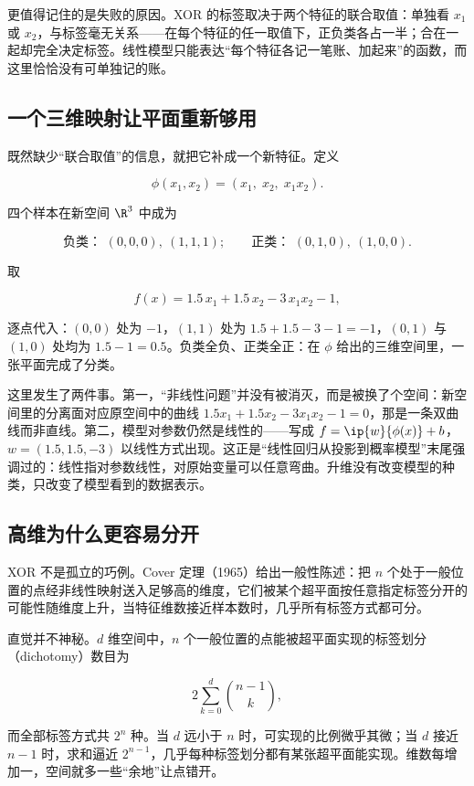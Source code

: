 更值得记住的是失败的原因。XOR 的标签取决于两个特征的联合取值：单独看 \(x_1\) 或 \(x_2\)，与标签毫无关系——在每个特征的任一取值下，正负类各占一半；合在一起却完全决定标签。线性模型只能表达``每个特征各记一笔账、加起来''的函数，而这里恰恰没有可单独记的账。

\subsection{一个三维映射让平面重新够用}

既然缺少``联合取值''的信息，就把它补成一个新特征。定义

\[
\phi(x_1,x_2)=(x_1,\;x_2,\;x_1x_2).
\]

四个样本在新空间 \(\R^3\) 中成为

\[
\text{负类： }(0,0,0),\ (1,1,1);
\qquad
\text{正类： }(0,1,0),\ (1,0,0).
\]

取

\[
f(x)=1.5\,x_1+1.5\,x_2-3\,x_1x_2-1,
\]

逐点代入：\((0,0)\) 处为 \(-1\)，\((1,1)\) 处为 \(1.5+1.5-3-1=-1\)，\((0,1)\) 与 \((1,0)\) 处均为 \(1.5-1=0.5\)。负类全负、正类全正：在 \(\phi\) 给出的三维空间里，一张平面完成了分类。

这里发生了两件事。第一，``非线性问题''并没有被消灭，而是被换了个空间：新空间里的分离面对应原空间中的曲线 \(1.5x_1+1.5x_2-3x_1x_2-1=0\)，那是一条双曲线而非直线。第二，模型对参数仍然是线性的——写成 \(f=\ip{w}{\phi(x)}+b\)，\(w=(1.5,1.5,-3)\) 以线性方式出现。这正是``线性回归从投影到概率模型''末尾强调过的：线性指对参数线性，对原始变量可以任意弯曲。升维没有改变模型的种类，只改变了模型看到的数据表示。

\subsection{高维为什么更容易分开}

XOR 不是孤立的巧例。Cover 定理（1965）给出一般性陈述：把 \(n\) 个处于一般位置的点经非线性映射送入足够高的维度，它们被某个超平面按任意指定标签分开的可能性随维度上升，当特征维数接近样本数时，几乎所有标签方式都可分。

直觉并不神秘。\(d\) 维空间中，\(n\) 个一般位置的点能被超平面实现的标签划分（dichotomy）数目为

\[
2\sum_{k=0}^{d}\binom{n-1}{k},
\]

而全部标签方式共 \(2^n\) 种。当 \(d\) 远小于 \(n\) 时，可实现的比例微乎其微；当 \(d\) 接近 \(n-1\) 时，求和逼近 \(2^{n-1}\)，几乎每种标签划分都有某张超平面能实现。维数每增加一，空间就多一些``余地''让点错开。

